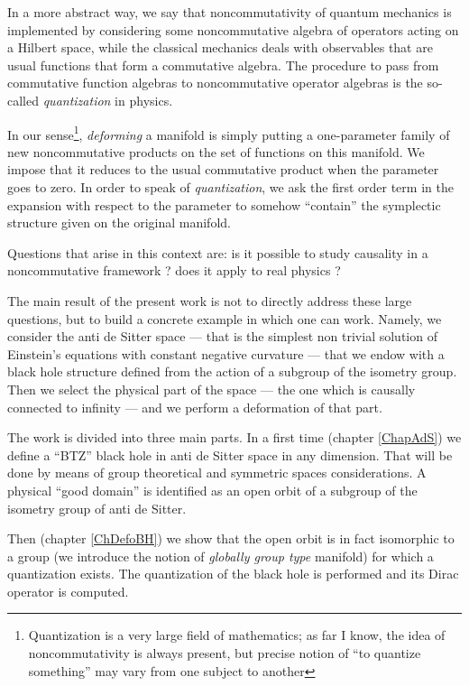 In a more abstract way, we say that noncommutativity of quantum mechanics is implemented by considering some noncommutative algebra of operators acting on a Hilbert space, while the classical mechanics deals with observables that are usual functions that form a commutative algebra. The procedure to pass from commutative function algebras to noncommutative operator algebras is the so-called \emph{quantization} in physics.

In our sense\footnote{Quantization is a very large field of mathematics; as far I know, the idea of noncommutativity is always present, but precise notion of ``to quantize something'' may vary from one subject to another}, \emph{deforming} a manifold is simply putting a one-parameter family of new noncommutative products on the set of functions on this manifold. We impose that it reduces to the usual commutative product when the parameter goes to zero. In order to speak of \emph{quantization}, we ask the first order term in the expansion with respect to the parameter to somehow ``contain'' the symplectic structure given on the original manifold.

Questions that arise in this context are: is it possible to study causality in a noncommutative framework ? does it apply to real physics ?

The main result of the present work is not to directly address these large questions, but to build a concrete example in which one can work. Namely, we consider the anti de Sitter space --- that is the simplest non trivial solution of Einstein's equations with constant negative curvature --- that we endow with a black hole structure defined from the action of a subgroup of the isometry group. Then we select the physical part of the space --- the one which is causally connected to infinity --- and we perform a deformation of that part.

The work is divided into three main parts. In a first  time (chapter \ref{ChapAdS}) we define a ``BTZ'' black hole in anti de Sitter space in any dimension. That will be done by means of group theoretical and symmetric spaces considerations. A physical ``good domain'' is identified as an open orbit of a subgroup of the isometry group of anti de Sitter. 

Then (chapter \ref{ChDefoBH}) we show that the open orbit is in fact isomorphic to a group (we introduce the notion of \emph{globally group type} manifold) for which a quantization exists. The quantization of the black hole is performed and its Dirac operator is computed.

